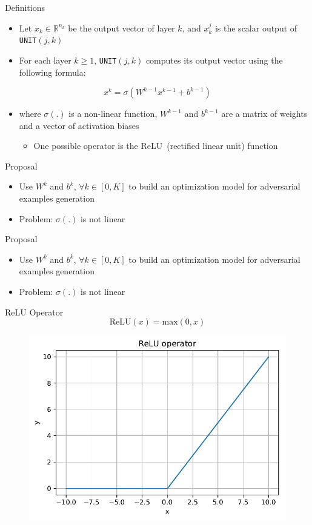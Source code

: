 \documentclass{beamer}
\begin{document}
\begin{frame}{Definitions}
  \begin{itemize}
  \item Let $x_k \in \mathbb{R}^{n_k}$ be the output vector of layer $k$, and $x^j_k$ is the scalar output of \texttt{UNIT}$(j,k)$
  \item For each layer $k \geq 1$, \texttt{UNIT}$(j,k)$ computes its output vector using the following formula:
  \end{itemize}
  $$
  x^k = \sigma(W^{k-1} x^{k-1} + b^{k-1})
  $$
  \begin{itemize}
  \item where $\sigma(.)$ is a non-linear function, $W^{k-1}$ and $b^{k-1}$ are a matrix of weights and a vector of activation biases
    \begin{itemize}
    \item One possible operator is the ReLU~(rectified linear unit) function
    \end{itemize}
  \end{itemize}
\end{frame}

\begin{frame}{Proposal}
\begin{itemize}
    \item Use $W^k$ and $b^k$, $\forall k \in [0, K]$ to build an optimization model for adversarial examples generation
    \item Problem: $\sigma(.)$ is not linear
\end{itemize}
\end{frame}

\begin{frame}{Proposal}
\begin{itemize}
    \item Use $W^k$ and $b^k$, $\forall k \in [0, K]$ to build an optimization model for adversarial examples generation
    \item Problem: $\sigma(.)$ is not linear
\end{itemize}
\end{frame}

\begin{frame}{ReLU Operator}
  $$ \text{ReLU}(x) = \text{max}(0, x) $$
  \begin{figure}[H]
    \centering
    \includegraphics[width=0.8\columnwidth]{relu}
  \end{figure}
\end{frame}
\end{document}
